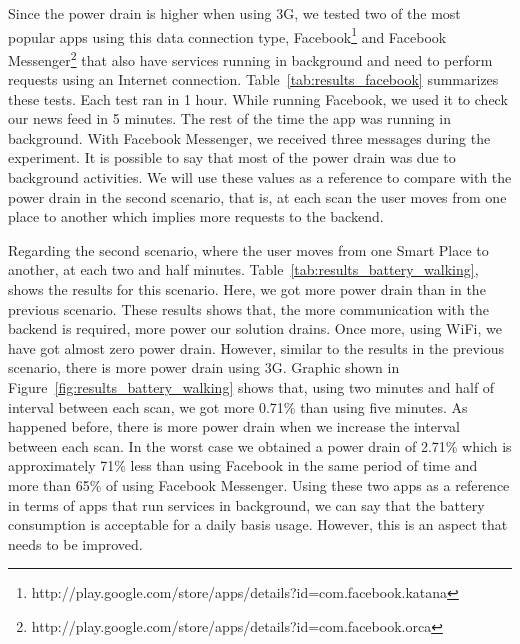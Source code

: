 Since the power drain is higher when using \gls{3G}, we tested two of the most popular apps using this data connection type, Facebook\footnote{http://play.google.com/store/apps/details?id=com.facebook.katana} and Facebook Messenger\footnote{http://play.google.com/store/apps/details?id=com.facebook.orca} that also have services running in background and need to perform requests using an Internet connection.
Table~\ref{tab:results_facebook} summarizes these tests.
Each test ran in 1 hour.
While running Facebook, we used it to check our news feed in 5 minutes. The rest of the time the app was running in background.
With Facebook Messenger, we received three messages during the experiment.
It is possible to say that most of the power drain was due to background activities.
We will use these values as a reference to compare with the power drain in the second scenario, that is, at each scan the user moves from one place to another which implies more requests to the backend.



Regarding the second scenario, where the user moves from one Smart Place to another, at each two and half minutes.
Table~\ref{tab:results_battery_walking}, shows the results for this scenario. Here, we got more power drain than in the previous scenario.
These results shows that, the more communication with the backend is required, more power our solution drains.
Once more, using \gls{WiFi}, we have got almost zero power drain.
However, similar to the results in the previous scenario, there is more power drain using \gls{3G}.
Graphic shown in Figure~\ref{fig:results_battery_walking} shows that, using two minutes and half of interval between each scan, we got more 0.71\% than using five minutes.
As happened before, there is more power drain when we increase the interval between each scan.
In the worst case we obtained a power drain of 2.71\% which is approximately 71\% less than using Facebook in the same period of time and more than 65\% of using Facebook Messenger.
Using these two apps as a reference in terms of apps that run services in background, we can say that the battery consumption is acceptable for a daily basis usage.
However, this is an aspect that needs to be improved.




